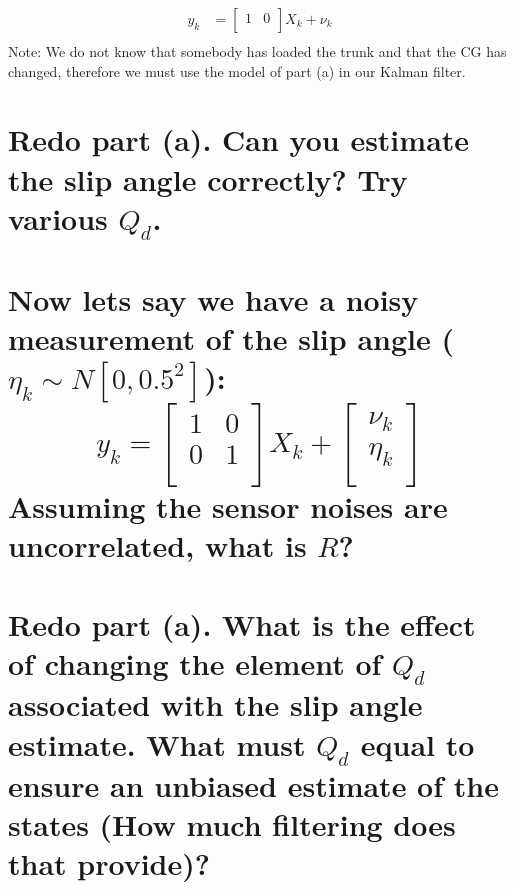 \documentclass[12pt,letterpaper, onecolumn]{exam}
\begin{document}
\begin{questions}
\begin{parts}
{\begin{equation*}
\begin{split}
                    y_k & =
                    \begin{bmatrix}
                        1 & 0 \\
                    \end{bmatrix}
                    X_k + \nu_k\\
                \end{split}
            \end{equation*}
            Note: We do not know that somebody has loaded the trunk and that the CG has changed, therefore we must use the model of part (a) in our Kalman filter.
        }

        \part{Redo part (a). Can you estimate the slip angle correctly? Try various $Q_d$.}

        \solution{%

        }

        \part{Now lets say we have a noisy measurement of the slip angle ($\eta_k \sim N\left[0,0.5^2\right]$):
            \[
                y_k =
                \begin{bmatrix}
                    1 & 0 \\
                    0 & 1 \\
                \end{bmatrix} X_k +
                \begin{bmatrix}
                    \nu_k  \\
                    \eta_k \\
                \end{bmatrix}
            \]
            Assuming the sensor noises are uncorrelated, what is $R$?}

        \part{Redo part (a). What is the effect of changing the element of $Q_d$ associated with the slip angle estimate. What must $Q_d$ equal to ensure an unbiased estimate of the states (How much filtering does that provide)?}


\end{parts}
\end{questions}
\end{document}
